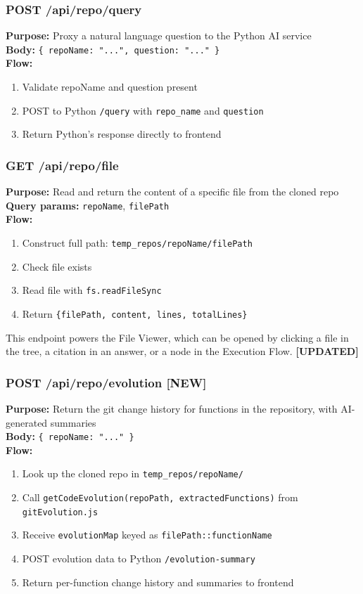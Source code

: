 \documentclass[a4paper,11pt]{article}
\begin{document}
\subsubsection{POST /api/repo/query}
\textbf{Purpose:} Proxy a natural language question to the Python AI service\\[2pt]
\textbf{Body:} \texttt{\{ repoName: "...", question: "..." \}}\\[4pt]
\textbf{Flow:}
\begin{enumerate}
    \item Validate repoName and question present
    \item POST to Python \texttt{/query} with \texttt{repo\_name} and \texttt{question}
    \item Return Python's response directly to frontend
\end{enumerate}

\subsubsection{GET /api/repo/file}
\textbf{Purpose:} Read and return the content of a specific file from the cloned repo\\[2pt]
\textbf{Query params:} \texttt{repoName}, \texttt{filePath}\\[4pt]
\textbf{Flow:}
\begin{enumerate}
    \item Construct full path: \texttt{temp\_repos/repoName/filePath}
    \item Check file exists
    \item Read file with \texttt{fs.readFileSync}
    \item Return \texttt{\{filePath, content, lines, totalLines\}}
\end{enumerate}

This endpoint powers the File Viewer, which can be opened by clicking a file in the tree, a citation in an answer, or a node in the Execution Flow. \textbf{[UPDATED]}

\subsubsection{POST /api/repo/evolution \textbf{[NEW]}}
\textbf{Purpose:} Return the git change history for functions in the repository, with AI-generated summaries\\[2pt]
\textbf{Body:} \texttt{\{ repoName: "..." \}}\\[4pt]
\textbf{Flow:}
\begin{enumerate}
    \item Look up the cloned repo in \texttt{temp\_repos/repoName/}
    \item Call \texttt{getCodeEvolution(repoPath, extractedFunctions)} from \texttt{gitEvolution.js}
    \item Receive \texttt{evolutionMap} keyed as \texttt{filePath::functionName}
    \item POST evolution data to Python \texttt{/evolution-summary}
    \item Return per-function change history and summaries to frontend
\end{enumerate}
\end{document}
